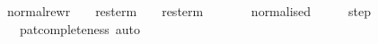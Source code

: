 \ normal{\isacharunderscore}rewr\ {\isacharcolon}{\isacharcolon}\ {\isachardoublequoteopen}{\isacharparenleft}\ \ res{\isacharunderscore}term\ {\isasymRightarrow}\ {\isacharparenleft}\ \ res{\isacharunderscore}term{\isachardoublequoteclose}\isanewline
\ \ \ {\isachardoublequoteopen}\ \ {\isacharequal}\ {\isacharparenleft}\ normalised\ \ \ \ \ \ {\isacharparenleft}step\ \isanewline
\ \ \ pat{\isacharunderscore}completeness\ auto
